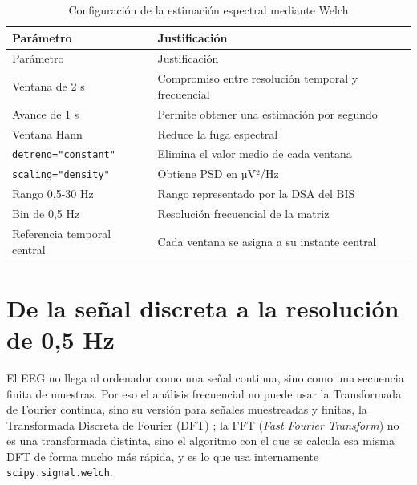 \documentclass[
  spanish,
  a4paper,
  12pt,
  twoside]{memoir}
\begin{document}
\begin{longtable}[]{@{}
  >{\raggedright\arraybackslash}p{}
  >{\raggedright\arraybackslash}p{}@{}}
\caption{Configuración de la estimación espectral mediante
Welch}\label{tbl-welch-config}\tabularnewline
\toprule\noalign{}
\begin{minipage}[b]{\linewidth}\raggedright
Parámetro
\end{minipage} & \begin{minipage}[b]{\linewidth}\raggedright
Justificación
\end{minipage} \\
\midrule\noalign{}
\endfirsthead
\toprule\noalign{}
\begin{minipage}[b]{\linewidth}\raggedright
Parámetro
\end{minipage} & \begin{minipage}[b]{\linewidth}\raggedright
Justificación
\end{minipage} \\
\midrule\noalign{}
\endhead
\bottomrule\noalign{}
\endlastfoot
Ventana de 2 s & Compromiso entre resolución temporal y frecuencial \\
Avance de 1 s & Permite obtener una estimación por segundo \\
Ventana Hann & Reduce la fuga espectral \\
\texttt{detrend="constant"} & Elimina el valor medio de cada ventana \\
\texttt{scaling="density"} & Obtiene PSD en µV²/Hz \\
Rango 0,5-30 Hz & Rango representado por la DSA del BIS \\
Bin de 0,5 Hz & Resolución frecuencial de la matriz \\
Referencia temporal central & Cada ventana se asigna a su instante
central \\
\end{longtable}

\section{De la señal discreta a la resolución de 0,5
Hz}\label{de-la-seuxf1al-discreta-a-la-resoluciuxf3n-de-05-hz}

El EEG no llega al ordenador como una señal continua, sino como una
secuencia finita de muestras. Por eso el análisis frecuencial no puede
usar la Transformada de Fourier continua, sino su versión para señales
muestreadas y finitas, la Transformada Discreta de Fourier (DFT)
\citep{OppenheimSchafer2014}; la FFT (\emph{Fast Fourier Transform}) no
es una transformada distinta, sino el algoritmo con el que se calcula
esa misma DFT de forma mucho más rápida, y es lo que usa internamente
\texttt{scipy.signal.welch}.
\end{document}
